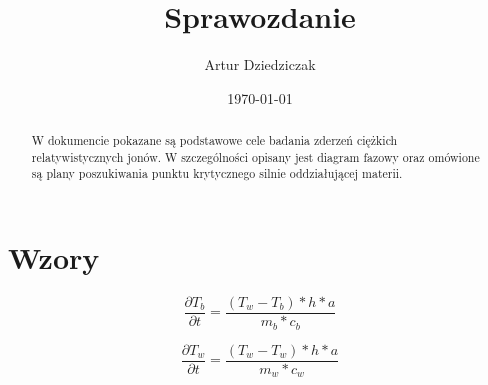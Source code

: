 \documentclass[12pt,a4paper]{article}
\title{Sprawozdanie}
\author{Artur Dziedziczak}
\date{\today}
\begin{document}
\maketitle

\begin{abstract}
W dokumencie pokazane są podstawowe cele badania zderzeń ciężkich relatywistycznych jonów. W szczególności opisany jest diagram fazowy oraz omówione są plany poszukiwania punktu krytycznego silnie oddziałującej materii.     
\end{abstract}


\section{Wzory}

\begin{equation}
    \frac{\partial T_b}{\partial t}=\frac{(T_w-T_b)*h*a}{m_b*c_b}
\end{equation}

\begin{equation}
    \frac{\partial T_w}{\partial t}=\frac{(T_w-T_w)*h*a}{m_w*c_w}
\end{equation}
\end{document}
